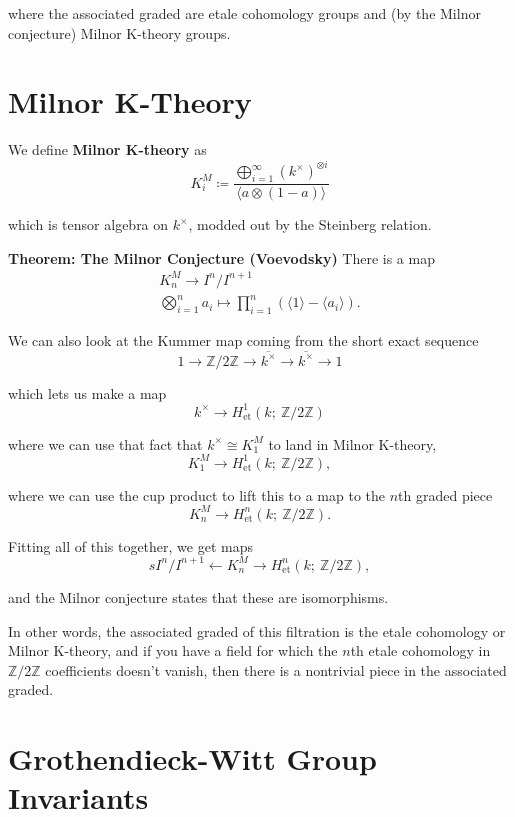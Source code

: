 \documentclass[11pt]{scrreprt}
\theoremstyle{definition}
\newcommand{\ZZ}[0]{{\mathbb{Z}}}
\newcommand{\generators}[1]{\langle{#1}\rangle}
\newcommand{\tensor}[0]{\otimes}
\newcommand{\from}[0]{\leftarrow}
\newcommand{\definedas}[0]{\coloneqq}
\begin{document}
where the associated graded are etale cohomology groups and (by the
Milnor conjecture) Milnor K-theory groups.

\hypertarget{milnor-k-theory}{%
\section{Milnor K-Theory}\label{milnor-k-theory}}

We define \textbf{Milnor K-theory} as \[
K_i^M \definedas \frac{\bigoplus_{i=1}^\infty  (k^\times)^{\tensor i} } {\generators{a\tensor(1-a)}}
\]

which is tensor algebra on \(k^\times\), modded out by the Steinberg
relation.

\textbf{Theorem: The Milnor Conjecture (Voevodsky)} There is a map
\begin{align*}
K_n^M \to I^n/I^{n+1} \\
\bigotimes_{i=1}^n a_i \mapsto \prod_{i=1}^n \left(\generators{1} - \generators{a_i}\right).
\end{align*}

We can also look at the Kummer map coming from the short exact sequence
\[
1\to \ZZ/2\ZZ \to \overline {k^\times} \to \overline{k^\times} \to 1
\]

which lets us make a map \[
k^\times \to H_\text{et}^1(k;~\ZZ/2\ZZ)
\]

where we can use that fact that \(k^\times \cong K^M_1\) to land in
Milnor K-theory, \[
K_1^M \to H_\text{et}^1(k;~\ZZ/2\ZZ),
\]

where we can use the cup product to lift this to a map to the \(n\)th
graded piece \[
K_n^M \to H_\text{et}^n(k;~\ZZ/2\ZZ).
\]

Fitting all of this together, we get maps \[s
I^n/I^{n+1} \from K_n^M \to H_\text{et}^n(k;~\ZZ/2\ZZ),
\]

and the Milnor conjecture states that these are isomorphisms.

In other words, the associated graded of this filtration is the etale
cohomology or Milnor K-theory, and if you have a field for which the
\(n\)th etale cohomology in \(\ZZ/2\ZZ\) coefficients doesn't vanish,
then there is a nontrivial piece in the associated graded.

\hypertarget{grothendieck-witt-group-invariants}{%
\section{Grothendieck-Witt Group
Invariants}\label{grothendieck-witt-group-invariants}}
\end{document}
